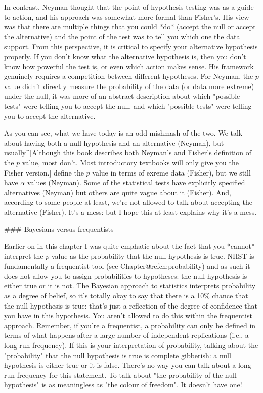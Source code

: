 In contrast, Neyman thought that the point of hypothesis testing was as a guide to action, and his approach was somewhat more formal than Fisher's. His view was that there are multiple things that you could *do* (accept the null or accept the alternative) and the point of the test was to tell you which one the data support. From this perspective, it is critical to specify your alternative hypothesis properly. If you don't know what the alternative hypothesis is, then you don't know how powerful the test is, or even which action makes sense. His framework genuinely requires a competition between different hypotheses. For Neyman, the $p$ value didn't directly measure the probability of the data (or data more extreme) under the null, it was more of an abstract description about which "possible tests" were telling you to accept the null, and which "possible tests" were telling you to accept the alternative.

As you can see, what we have today is an odd mishmash of the two. We talk about having both a null hypothesis and an alternative (Neyman), but usually^[Although this book describes both Neyman's and Fisher's definition of the $p$ value, most don't. Most introductory textbooks will only give you the Fisher version.] define the $p$ value in terms of exreme data (Fisher), but we still have $\alpha$ values (Neyman). Some of the statistical tests have explicitly specified alternatives (Neyman) but others are quite vague about it (Fisher). And, according to some people at least, we're not allowed to talk about accepting the alternative (Fisher). It's a mess: but I hope this at least explains why it's a mess.

### Bayesians versus frequentists

Earlier on in this chapter I was quite emphatic about the fact that you *cannot* interpret the $p$ value as the probability that the null hypothesis is true. NHST is fundamentally a frequentist tool (see Chapter@refch:probability) and as such it does not allow you to assign probabilities to hypotheses: the null hypothesis is either true or it is not. The Bayesian approach to statistics interprets probability as a degree of belief, so it's totally okay to say that there is a 10\% chance that the null hypothesis is true: that's just a reflection of the degree of confidence that you have in this hypothesis. You aren't allowed to do this within the frequentist approach. Remember, if you're a frequentist, a probability can only be defined in terms of what happens after a large number of independent replications (i.e., a long run frequency). If this is your interpretation of probability, talking about the "probability" that the null hypothesis is true is complete gibberish: a null hypothesis is either true or it is false. There's no way you can talk about a long run frequency for this statement. To talk about "the probability of the null hypothesis" is as meaningless as "the colour of freedom". It doesn't have one!


